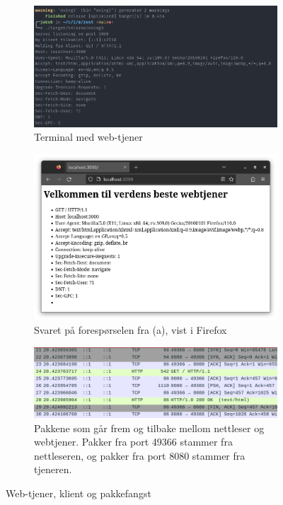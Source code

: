 \documentclass{article}
\begin{document}
\begin{figure}[h]
    \centering
    \begin{subfigure}{.48\linewidth}
        \includegraphics[width=\linewidth]{illustrasjoner/P3-web-tjener.png}
        \caption{Terminal med web-tjener}
    \end{subfigure}
    \hfill
    \begin{subfigure}{.48\linewidth}
        \includegraphics[width=\linewidth]{illustrasjoner/P3-web-klient.png}
        \caption{Svaret på forespørselen fra (a), vist i Firefox}
    \end{subfigure}

    \begin{subfigure}{.8\linewidth}
        \includegraphics[width=\linewidth]{illustrasjoner/P3-web-capture.png}
        \caption{Pakkene som går frem og tilbake mellom nettleser og webtjener. Pakker fra port 49366 stammer fra nettleseren, og pakker fra port 8080 stammer fra tjeneren.}
    \end{subfigure}
    \caption{Web-tjener, klient og pakkefangst}
\end{figure}
\end{document}
